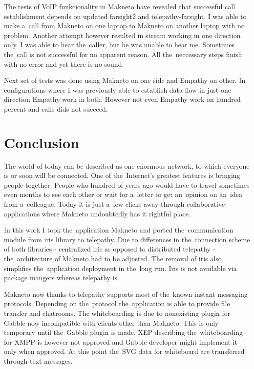 The tests of VoIP funkcionality in Makneto have revealed that successful call establishment depends on updated farsight2 and telepathy-farsight. I was able to make a~call from Makneto on one laptop to Makneto on another laptop with no problem. Another attempt however resulted in stream working in one direction only. I was able to hear the~caller, but he was unable to hear me. Sometimes the~call is not successful for no apparent reason. All the~neccessary steps finish with no error and yet there is no sound. 

Next set of tests was done using Makneto on one side and Empathy on other. In configurations where I was previously able to establish data flow in just one direction Empathy work in both. However not even Empathy work on hundred percent and calls dids not succeed. 


\chapter{Conclusion}
The world of today can be described as one enormous network, to which everyone is or soon will be connected. One of the~Internet's greatest features is bringing people together. People who hundred of years ago would have to travel sometimes even months to see each other or wait for a~letter to get an~opinion on an~idea from a~colleague. Today it is just a~few clicks away through collaborative applications where Makneto undoubtedly has it rightful place.

In this work I took the~application Makneto and ported the~communication module from iris library to telepathy. Due to differences in the~connection scheme of both libraries - centralized iris as opposed to distributed telepathy - the~architecture of Makneto had to be adjusted. The removal of iris also simplifies the~application deployment in the~long run. Iris is not available via package mangers whereas telepathy is. 

Makneto now thanks to telepathy supports most of the~known instant messaging protocols. Depending on the~protocol the~application is able to provide file transfer and chatrooms. The whiteboarding is due to nonexisting plugin for Gabble now incompatible with clients other than Makneto. This is only temporary until the~Gabble plugin is made. XEP describing the~whiteboarding for XMPP is however not approved and Gabble developer might implement it only when approved. At this point the~SVG data for whiteboard are transferred through text messages. 

